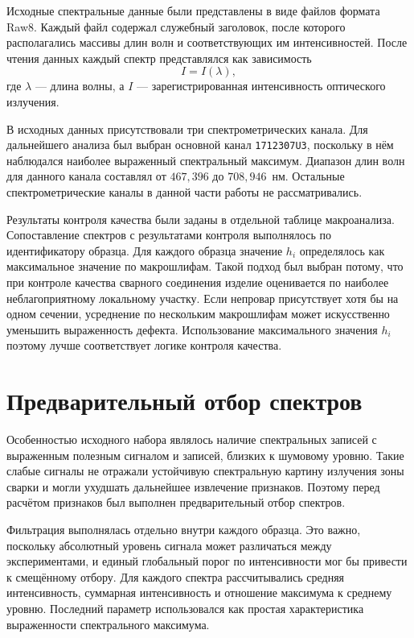 Исходные спектральные данные были представлены в виде файлов формата Raw8. Каждый файл содержал служебный заголовок, после которого располагались массивы длин волн и соответствующих им интенсивностей. После чтения данных каждый спектр представлялся как зависимость
\[
I = I(\lambda),
\]
где \(\lambda\) --- длина волны, а \(I\) --- зарегистрированная интенсивность оптического излучения.

В исходных данных присутствовали три спектрометрических канала. Для дальнейшего анализа был выбран основной канал \texttt{1712307U3}, поскольку в нём наблюдался наиболее выраженный спектральный максимум. Диапазон длин волн для данного канала составлял от \(467,396\) до \(708,946\)~нм. Остальные спектрометрические каналы в данной части работы не рассматривались.

Результаты контроля качества были заданы в отдельной таблице макроанализа. Сопоставление спектров с результатами контроля выполнялось по идентификатору образца. Для каждого образца значение \(h_i\) определялось как максимальное значение по макрошлифам. Такой подход был выбран потому, что при контроле качества сварного соединения изделие оценивается по наиболее неблагоприятному локальному участку. Если непровар присутствует хотя бы на одном сечении, усреднение по нескольким макрошлифам может искусственно уменьшить выраженность дефекта. Использование максимального значения \(h_i\) поэтому лучше соответствует логике контроля качества.

\section{Предварительный отбор спектров}

Особенностью исходного набора являлось наличие спектральных записей с выраженным полезным сигналом и записей, близких к шумовому уровню. Такие слабые сигналы не отражали устойчивую спектральную картину излучения зоны сварки и могли ухудшать дальнейшее извлечение признаков. Поэтому перед расчётом признаков был выполнен предварительный отбор спектров.

Фильтрация выполнялась отдельно внутри каждого образца. Это важно, поскольку абсолютный уровень сигнала может различаться между экспериментами, и единый глобальный порог по интенсивности мог бы привести к смещённому отбору. Для каждого спектра рассчитывались средняя интенсивность, суммарная интенсивность и отношение максимума к среднему уровню. Последний параметр использовался как простая характеристика выраженности спектрального максимума.

